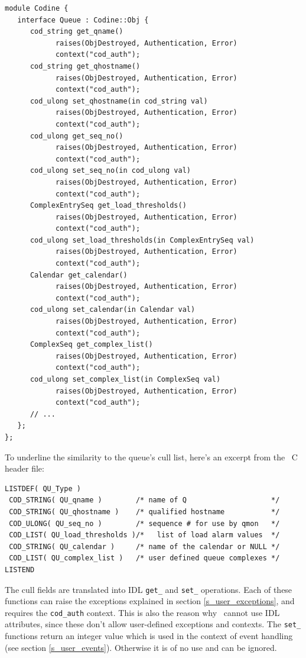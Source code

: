 \begin{Verbatim}[fontsize=\small, frame=single]
module Codine {
   interface Queue : Codine::Obj {
      cod_string get_qname()
            raises(ObjDestroyed, Authentication, Error)
            context("cod_auth");
      cod_string get_qhostname()
            raises(ObjDestroyed, Authentication, Error)
            context("cod_auth");
      cod_ulong set_qhostname(in cod_string val) 
            raises(ObjDestroyed, Authentication, Error) 
            context("cod_auth");
      cod_ulong get_seq_no() 
            raises(ObjDestroyed, Authentication, Error) 
            context("cod_auth");
      cod_ulong set_seq_no(in cod_ulong val) 
            raises(ObjDestroyed, Authentication, Error) 
            context("cod_auth");
      ComplexEntrySeq get_load_thresholds() 
            raises(ObjDestroyed, Authentication, Error) 
            context("cod_auth");
      cod_ulong set_load_thresholds(in ComplexEntrySeq val) 
            raises(ObjDestroyed, Authentication, Error) 
            context("cod_auth");
      Calendar get_calendar() 
            raises(ObjDestroyed, Authentication, Error) 
            context("cod_auth");
      cod_ulong set_calendar(in Calendar val) 
            raises(ObjDestroyed, Authentication, Error) 
            context("cod_auth");
      ComplexSeq get_complex_list() 
            raises(ObjDestroyed, Authentication, Error) 
            context("cod_auth");
      cod_ulong set_complex_list(in ComplexSeq val) 
            raises(ObjDestroyed, Authentication, Error) 
            context("cod_auth");
      // ...
   };
};
\end{Verbatim}

To underline the similarity to the queue's cull list, here's an excerpt from
the \codapi\ C header file:

\begin{Verbatim}[fontsize=\small, frame=single]
LISTDEF( QU_Type )
 COD_STRING( QU_qname )        /* name of Q                    */
 COD_STRING( QU_qhostname )    /* qualified hostname           */
 COD_ULONG( QU_seq_no )        /* sequence # for use by qmon   */
 COD_LIST( QU_load_thresholds )/*   list of load alarm values  */
 COD_STRING( QU_calendar )     /* name of the calendar or NULL */
 COD_LIST( QU_complex_list )   /* user defined queue complexes */
LISTEND
\end{Verbatim}

The cull fields are translated into IDL \texttt{get\_} and \texttt{set\_}
operations. Each of these functions can raise the exceptions explained in
section \ref{s_user_exceptions}, and requires the \texttt{cod\_auth} context.
This is also the reason why \qidl\ cannot use IDL attributes, since these
don't allow user-defined exceptions and contexts. The \texttt{set\_}
functions return an integer value which is used in the context of event
handling (see section \ref{s_user_events}). Otherwise it is of no use and can
be ignored.

